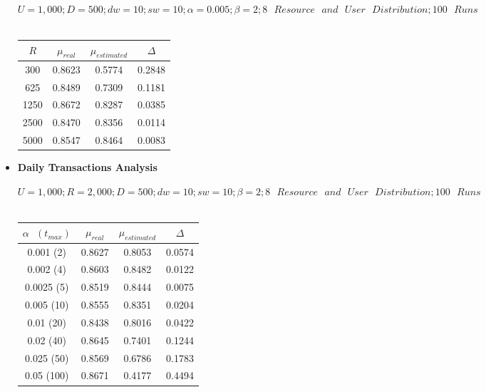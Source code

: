 \documentclass[12pt,a4paper]{report}
\begin{document}
\begin{itemize}
\begin{center}
\textup{\textbf{$U=1,000; D=500; dw=10; sw=10; \alpha=0.005; \beta=2; 8\text{ }Resource\text{ }and\text{ }User\text{ }Distribution; 100\text{ }Runs$\\}}
\textup{\\}
\begin{tabular}{|c|c|c|c|}
\hline
\textbf{$R$} & \textbf{$\mu_{real}$} & \textbf{$\mu_{estimated}$} & \textbf{$\Delta$}\\
\hline
300 & 0.8623 & 0.5774 & 0.2848 \\
\hline
625 & 0.8489 & 0.7309 & 0.1181 \\
\hline
1250 & 0.8672 & 0.8287 & 0.0385 \\
\hline
2500 & 0.8470 & 0.8356 & 0.0114\\
\hline
5000 & 0.8547 & 0.8464 & 0.0083\\
\hline
\end{tabular}
\end{center}

	\item \textbf{Daily Transactions Analysis}

\begin{center}
\textup{\textbf{$U = 1,000; R = 2,000; D = 500; dw=10; sw=10; \beta=2; 8 \text{ }Resource \text{ }and \text{ }User\text{ } Distribution; 100\text{ }Runs$\\}}
\textup{\\}
\begin{tabular}{|c|c|c|c|}
\hline
\textbf{$\alpha\text{ }(t_{max})$} & \textbf{$\mu_{real}$} & \textbf{$\mu_{estimated}$} & \textbf{$\Delta$}\\
\hline
0.001 (2) & 0.8627 & 0.8053 & 0.0574 \\
\hline
0.002 (4) & 0.8603 & 0.8482 & 0.0122 \\
\hline
0.0025 (5) & 0.8519 & 0.8444 & 0.0075 \\
\hline
0.005 (10) & 0.8555 & 0.8351 & 0.0204 \\
\hline
0.01 (20) & 0.8438 & 0.8016 & 0.0422 \\
\hline
0.02 (40) & 0.8645 & 0.7401 & 0.1244 \\
\hline
0.025 (50) & 0.8569 & 0.6786 & 0.1783 \\
\hline
0.05 (100) & 0.8671 & 0.4177 & 0.4494 \\
\hline
\end{tabular}
\end{center}

	\end{itemize}
\clearpage
\end{document}
